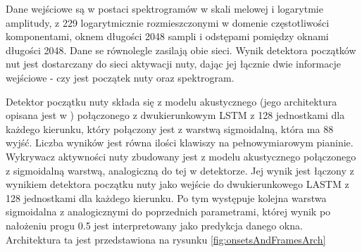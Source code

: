 \documentclass[12pt,a4paper,twoside]{mwart}
\begin{document}
Dane wejściowe są w postaci spektrogramów w skali melowej i logarytmie amplitudy, z 229 logarytmicznie rozmieszczonymi w domenie częstotliwości komponentami, oknem długości 2048 sampli i odstępami pomiędzy oknami długości 2048. Dane se równolegle zasilają obie sieci. Wynik detektora początków nut jest dostarczany do sieci aktywacji nuty, dając jej łącznie dwie informacje wejściowe - czy jest początek nuty oraz spektrogram.

Detektor początku nuty składa się z modelu akustycznego (jego architektura opisana jest w \cite[1-3]{Transcription:Kelz:AcousticModel}) połączonego z dwukierunkowym LSTM z 128 jednostkami dla każdego kierunku, który połączony jest z warstwą sigmoidalną, która ma 88 wyjść. Liczba wyników jest równa ilości klawiszy na pełnowymiarowym pianinie. Wykrywacz aktywności nuty zbudowany jest z modelu akustycznego połączonego z sigmoidalną warstwą, analogiczną do tej w detektorze. Jej wynik jest łączony z wynikiem detektora początku nuty jako wejście do dwukierunkowego LASTM z 128 jednostkami dla każdego kierunku. Po tym występuje kolejna warstwa sigmoidalna z analogicznymi do poprzednich parametrami, której wynik po nałożeniu progu 0.5 jest interpretowany jako predykcja danego okna. Architektura ta jest przedstawiona na rysunku \ref{fig:onsetsAndFramesArch}
\end{document}
